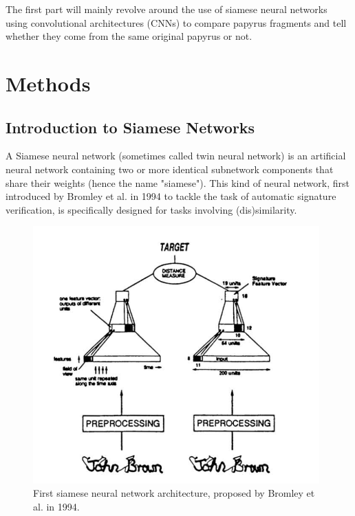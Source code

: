 \documentclass[11pt]{report}
\begin{document}
The first part will mainly revolve around the use of siamese neural networks using convolutional architectures (CNNs) to compare papyrus fragments and tell whether they come from the same original papyrus or not.\newline

\newpage


\chapter{Methods}

\section{Introduction to Siamese Networks}

A Siamese neural network (sometimes called twin neural network) is an artificial neural network containing two or more identical subnetwork components that share their weights (hence the name "siamese"). This kind of neural network, first introduced by Bromley et al. in 1994 \cite{bromley94} to tackle the task of automatic signature verification, is specifically designed for tasks involving (dis)similarity.\newline

\begin{figure}[H]
\centering\includegraphics[width=11cm]{siamese94.PNG}
\caption{First siamese neural network architecture, proposed by Bromley et al. in 1994.}
\label{papyrus}
\end{figure}
\end{document}
